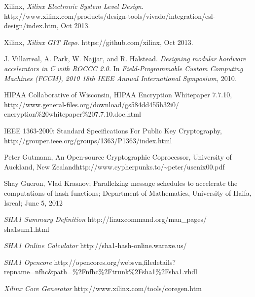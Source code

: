\documentclass[journal]{IEEEtran}
\begin{document}
\begin{thebibliography}{1}
Xilinx,
 \emph{Xilinx Electronic System Level Design}.    
 http://www.xilinx.com/products/design-tools/vivado/integration/esl-design/index.htm, Oct 2013.
 
Xilinx,
 \emph{Xilinx GIT Repo}.    
 https://github.com/xilinx, Oct 2013.
 
J. Villarreal, A. Park, W. Najjar, and R. Halstead.
\emph{Designing modular hardware accelerators in C with ROCCC 2.0.}
In\emph{ Field-Programmable Custom Computing Machines (FCCM), 2010
18th IEEE Annual International Symposium, }2010\emph{.}

HIPAA Collaborative of Wisconsin, HIPAA Encryption
Whitepaper 7.7.10, http://www.general-files.org/download/gs584dd455h32i0/ encryption\%20whitepaper\%207.7.10.doc.html

IEEE 1363-2000: Standard Specifications For Public
Key Cryptography, http://grouper.ieee.org/groups/1363/P1363/index.html

Peter Gutmann, An Open-source Cryptographic Coprocessor,
University of Auckland, New Zealandhttp://www.cypherpunks.to/\textasciitilde{}peter/usenix00.pdf

Shay Gueron, Vlad Krasnov; Parallelzing message schedules
to accelerate the computations of hash functions; Department of Mathematics,
University of Haifa, Isreal; June 5, 2012

 \emph{SHA1 Summary Definition}
 http://linuxcommand.org/man\_pages/ sha1sum1.html
 
 \emph{SHA1 Online Calculator}
 http://sha1-hash-online.waraxe.us/ 
 
 \emph{SHA1 Opencore}
 http://opencores.org/websvn,filedetails? repname=nfhc\&path=\%2Fnfhc\%2Ftrunk\%2Fsha1\%2Fsha1.vhdl

\emph{Xilinx Core Generator}
 http://www.xilinx.com/tools/coregen.htm

\end{thebibliography}
\end{document}
